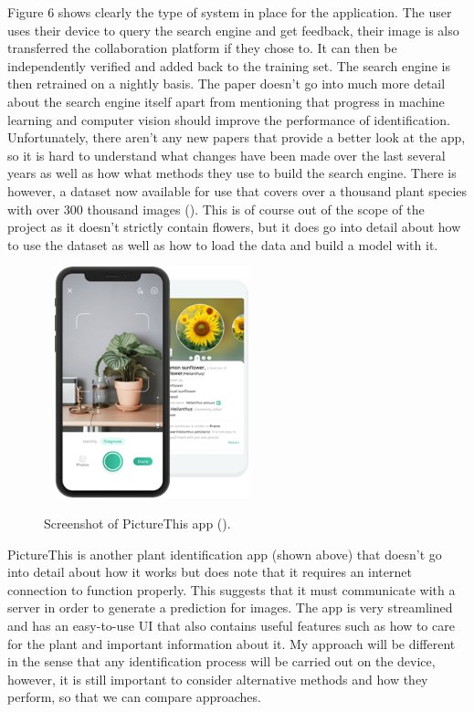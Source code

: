 \documentclass{article}
\begin{document}
Figure 6 shows clearly the type of system in place for the application. The user uses their device to query the search
engine and get feedback, their image is also transferred the collaboration platform if they chose to. It can then be 
independently verified and added back to the training set. The search engine is then retrained on a nightly basis. The 
paper doesn't go into much more detail about the search engine itself apart from mentioning that progress in machine 
learning and computer vision should improve the performance of identification. Unfortunately, there aren't any new 
papers that provide a better look at the app, so it is hard to understand what changes have been made over the last 
several years as well as how what methods they use to build the search engine. There is however, a dataset now 
available for use that covers over a thousand plant species with over 300 thousand images 
(\cite{camille_garcin_2021_5645731}). This is of course out of the scope of the project as it doesn't strictly contain 
flowers, but it does go into detail about how to use the dataset as well as how to load the data and build a model with 
it.

\begin{figure}[h]\
    \centering
    \includegraphics[width=0.5\textwidth]{picturethis.png}
    \caption{Screenshot of PictureThis app (\cite{picturethis}).}
\end{figure}

PictureThis is another plant identification app (shown above) that doesn't go into detail about how it works but does 
note that it requires an internet connection to function properly. This suggests that it must communicate with a server 
in order to generate a prediction for images. The app is very streamlined and has an easy-to-use UI that also contains 
useful features such as how to care for the plant and important information about it. My approach will be different in 
the sense that any identification process will be carried out on the device, however, it is still important to consider 
alternative methods and how they perform, so that we can compare approaches.
\end{document}
